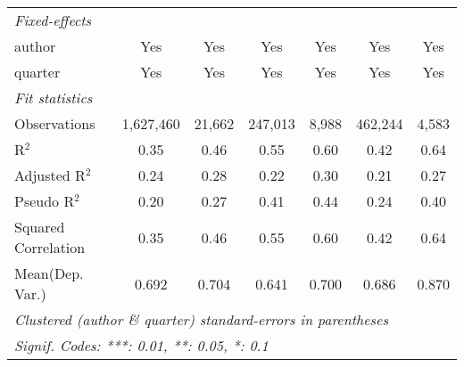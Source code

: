 \begin{tabular}{lcccccc}
   \midrule
   \emph{Fixed-effects}\\
   author                                                     & Yes            & Yes           & Yes            & Yes           & Yes            & Yes\\  
   quarter                                                    & Yes            & Yes           & Yes            & Yes           & Yes            & Yes\\  
   \midrule
   \emph{Fit statistics}\\
   Observations                                               & 1,627,460      & 21,662        & 247,013        & 8,988         & 462,244        & 4,583\\  
   R$^2$                                                      & 0.35           & 0.46          & 0.55           & 0.60          & 0.42           & 0.64\\  
   Adjusted R$^2$                                             & 0.24           & 0.28          & 0.22           & 0.30          & 0.21           & 0.27\\  
   Pseudo R$^2$                                               & 0.20           & 0.27          & 0.41           & 0.44          & 0.24           & 0.40\\  
   Squared Correlation                                        & 0.35           & 0.46          & 0.55           & 0.60          & 0.42           & 0.64\\  
Mean(Dep. Var.) & 0.692 & 0.704 & 0.641 & 0.700 & 0.686 & 0.870 \\
   \midrule \midrule
   \multicolumn{7}{l}{\emph{Clustered (author \& quarter) standard-errors in parentheses}}\\
   \multicolumn{7}{l}{\emph{Signif. Codes: ***: 0.01, **: 0.05, *: 0.1}}\\
\end{tabular}
\par\endgroup
